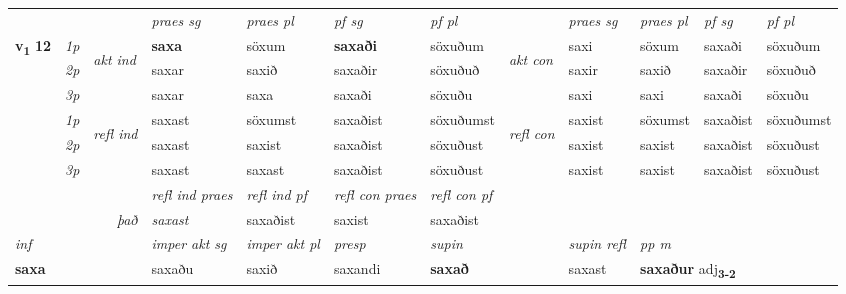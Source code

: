 \begin{longtable}[l]{X>{\footnotesize\itshape}llXXXXlXXXX}
\midrule

 & &   & \textit{praes sg}  & \textit{praes pl}    & \textit{ pf sg} & \textit{pf pl} & & \textit{praes sg}  & \textit{praes pl}    & \textit{pf sg} & \textit{pf pl }  \\ \cmidrule{4-7} \cmidrule{9-12}
 \multirow{2}{*}{{{\textbf{v{\textsubscript{1}}} \Large{\textbf{12}}}}}  & 1p & \multirow{3}{*}{\begin{turn}{90}\textit{akt ind}\end{turn}} & \textbf{saxa} & söxum & \textbf{saxaði} & söxuðum & \multirow{3}{*}{\begin{turn}{90}\textit{akt con}\end{turn}} &saxi & söxum & saxaði & söxuðum\\*
 & 2p &  &  saxar  & saxið & saxaðir & söxuðuð & & saxir & saxið & saxaðir & söxuðuð \\*
 & 3p &  & saxar & saxa & saxaði & söxuðu & & saxi & saxi& saxaði & söxuðu \\*
\cmidrule{4-7} \cmidrule{9-12}
 & 1p & \multirow{3}{*}{\begin{turn}{90}\textit{refl ind}\end{turn}}  & saxast & söxumst & saxaðist & söxuðumst & \multirow{3}{*}{\begin{turn}{90}\textit{refl con}\end{turn}}  &saxist & söxumst & saxaðist & söxuðumst \\*
 & 2p &  & saxast & saxist & saxaðist & söxuðust & &saxist & saxist & saxaðist & söxuðust \\*
 & 3p  & & saxast & saxast & saxaðist & söxuðust & & saxist & saxist& saxaðist & söxuðust \\*
\cmidrule{4-7} \cmidrule{9-12}

 & && \textit{refl ind praes} & \textit{refl ind pf} & \textit{refl con praes} & \textit{refl con pf} \\*
\multicolumn{3}{r}{\textit{það}}& saxast & saxaðist & saxist & saxaðist \\*

\cmidrule{4-7}
   {\textit{inf}} & &  & \textit{imper akt sg} & \textit{imper akt pl}   & \textit{presp} & \textit{supin} && \textit{supin refl} & \textit{pp m} \\*
  {\textbf{saxa}} & && saxaðu  & saxið   & saxandi &  \textbf{saxað} && saxast & \multicolumn{2}{l}{\textbf{saxaður} adj\textbf{\textsubscript{3-2}}} \\*

\midrule


\end{longtable}
